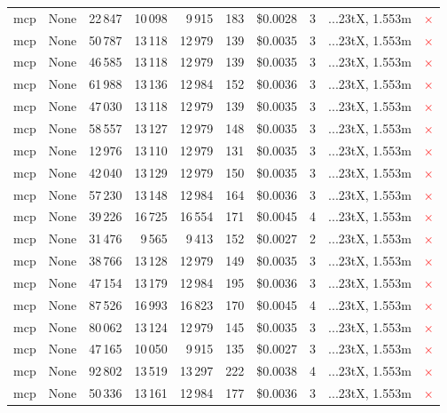 \documentclass[a4paper,11pt]{article}
\begin{document}
\begin{table}[H]
{\begin{tabular}{l r r r r r r r l c}
mcp & None & 22\,847 & 10\,098 & 9\,915 & 183 & \$0.0028 & 3 & ...23tX, 1.553m & \textcolor{red}{\(\times\)} \\
mcp & None & 50\,787 & 13\,118 & 12\,979 & 139 & \$0.0035 & 3 & ...23tX, 1.553m & \textcolor{red}{\(\times\)} \\
mcp & None & 46\,585 & 13\,118 & 12\,979 & 139 & \$0.0035 & 3 & ...23tX, 1.553m & \textcolor{red}{\(\times\)} \\
mcp & None & 61\,988 & 13\,136 & 12\,984 & 152 & \$0.0036 & 3 & ...23tX, 1.553m & \textcolor{red}{\(\times\)} \\
mcp & None & 47\,030 & 13\,118 & 12\,979 & 139 & \$0.0035 & 3 & ...23tX, 1.553m & \textcolor{red}{\(\times\)} \\
mcp & None & 58\,557 & 13\,127 & 12\,979 & 148 & \$0.0035 & 3 & ...23tX, 1.553m & \textcolor{red}{\(\times\)} \\
mcp & None & 12\,976 & 13\,110 & 12\,979 & 131 & \$0.0035 & 3 & ...23tX, 1.553m & \textcolor{red}{\(\times\)} \\
mcp & None & 42\,040 & 13\,129 & 12\,979 & 150 & \$0.0035 & 3 & ...23tX, 1.553m & \textcolor{red}{\(\times\)} \\
mcp & None & 57\,230 & 13\,148 & 12\,984 & 164 & \$0.0036 & 3 & ...23tX, 1.553m & \textcolor{red}{\(\times\)} \\
mcp & None & 39\,226 & 16\,725 & 16\,554 & 171 & \$0.0045 & 4 & ...23tX, 1.553m & \textcolor{red}{\(\times\)} \\
mcp & None & 31\,476 & 9\,565 & 9\,413 & 152 & \$0.0027 & 2 & ...23tX, 1.553m & \textcolor{red}{\(\times\)} \\
mcp & None & 38\,766 & 13\,128 & 12\,979 & 149 & \$0.0035 & 3 & ...23tX, 1.553m & \textcolor{red}{\(\times\)} \\
mcp & None & 47\,154 & 13\,179 & 12\,984 & 195 & \$0.0036 & 3 & ...23tX, 1.553m & \textcolor{red}{\(\times\)} \\
mcp & None & 87\,526 & 16\,993 & 16\,823 & 170 & \$0.0045 & 4 & ...23tX, 1.553m & \textcolor{red}{\(\times\)} \\
mcp & None & 80\,062 & 13\,124 & 12\,979 & 145 & \$0.0035 & 3 & ...23tX, 1.553m & \textcolor{red}{\(\times\)} \\
mcp & None & 47\,165 & 10\,050 & 9\,915 & 135 & \$0.0027 & 3 & ...23tX, 1.553m & \textcolor{red}{\(\times\)} \\
mcp & None & 92\,802 & 13\,519 & 13\,297 & 222 & \$0.0038 & 4 & ...23tX, 1.553m & \textcolor{red}{\(\times\)} \\
mcp & None & 50\,336 & 13\,161 & 12\,984 & 177 & \$0.0036 & 3 & ...23tX, 1.553m & \textcolor{red}{\(\times\)} \\

\end{tabular}}
\end{table}
\end{document}
